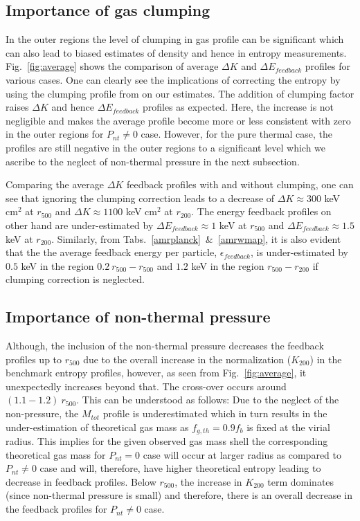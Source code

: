 \documentclass[a4paper,fleqn,usenatbib]{mnras}
\begin{document}
\subsection{Importance of gas clumping}
In the outer regions the level of clumping in gas profile can be significant which can also lead to  biased estimates
of density and hence in entropy measurements. Fig.~\ref{fig:average} shows the comparison of average $\Delta K$ and $\Delta E_{feedback}$ profiles for various cases. One can clearly see the implications of correcting the entropy by using the  clumping profile from \cite{Eckert2015} on our estimates. The addition of clumping factor raises $\Delta K$ and hence $\Delta E_{feedback}$ profiles as expected. Here, the increase is not negligible and makes the average profile become more or less consistent with zero in the outer regions for $P_{nt}\neq0$ case. However, for the pure thermal case, the profiles are still negative in the outer regions to a significant level which we ascribe to the  neglect of non-thermal pressure in the next subsection.

Comparing the average $\Delta K$ feedback profiles with and without clumping, one can see that ignoring the clumping correction leads to a decrease of $\Delta K\approx 300$ keV cm$^2$ at $r_{500}$ and $\Delta K\approx 1100$ keV cm$^2$ at $r_{200}$. The energy feedback profiles on other hand are under-estimated by $\Delta E_{feedback} \approx 1$ keV at $r_{500}$ and $\Delta E_{feedback} \approx 1.5$ keV at $r_{200}$. Similarly, from Tabs.~\ref{amrplanck}~\&~\ref{amrwmap}, it is also evident that the the average feedback energy per particle, $\epsilon_{feedback}$, is under-estimated by $0.5$ keV in the region $0.2~r_{500}-r_{500}$ and $1.2$ keV in the region $r_{500}-r_{200}$ if clumping correction is neglected. 
\subsection{Importance of non-thermal pressure}
Although, the inclusion of the non-thermal pressure decreases the feedback profiles up to $r_{500}$ due to the overall increase in the normalization ($K_{200}$) in the benchmark entropy profiles, however, as seen from Fig.~\ref{fig:average}, it unexpectedly increases beyond that.  The cross-over occurs around $(1.1-1.2)~r_{500}$. This can be understood as follows: Due to the neglect of the non-pressure, the $M_{tot}$ profile is underestimated which in turn results in the under-estimation of theoretical gas mass as $f_{g,th}=0.9f_b$ is fixed at the virial radius.  This implies for the given observed gas mass shell the corresponding theoretical gas mass  for $P_{nt}=0$ case will occur at larger radius  as compared to $P_{nt}\neq0$ case and  will, therefore, have higher theoretical entropy leading to decrease in feedback profiles. Below $r_{500}$, the increase in $K_{200}$ term dominates (since non-thermal pressure is small) and therefore, there is an overall decrease in the feedback profiles for $P_{nt}\neq0$ case.
\end{document}
